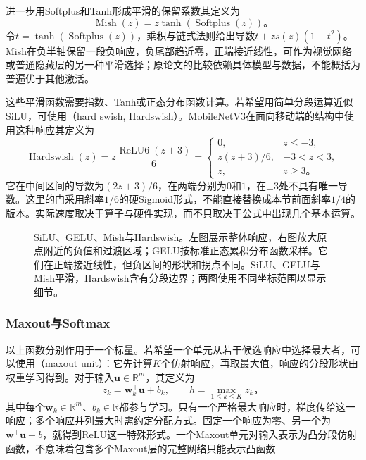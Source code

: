 进一步用Softplus和Tanh形成平滑的保留系数其定义为
\begin{equation}
  \operatorname{Mish}(z)=z\tanh(\operatorname{Softplus}(z))\text{。}
  \label{eq:ffn-mish}
\end{equation}
令$t=\tanh(\operatorname{Softplus}(z))$，乘积与链式法则给出导数$t+zs(z)(1-t^2)$。Mish在负半轴保留一段负响应，负尾部趋近零，正端接近线性，可作为视觉网络或普通隐藏层的另一种平滑选择；原论文的比较依赖具体模型与数据，不能概括为普遍优于其他激活。

这些平滑函数需要指数、Tanh或正态分布函数计算。若希望用简单分段运算近似SiLU，可使用（hard swish, Hardswish）。MobileNetV3在面向移动端的结构中使用这种响应其定义为
\begin{equation}
  \operatorname{Hardswish}(z)=z\frac{\operatorname{ReLU6}(z+3)}6
  =\begin{cases}
    0,&z\leq-3,\\
    z(z+3)/6,&-3<z<3,\\
    z,&z\geq3\text{。}
  \end{cases}
  \label{eq:ffn-hardswish}
\end{equation}
它在中间区间的导数为$(2z+3)/6$，在两端分别为$0$和$1$，在$\pm3$处不具有唯一导数。这里的门采用斜率$1/6$的硬Sigmoid形式，不能直接替换成本节前面斜率$1/4$的版本。实际速度取决于算子与硬件实现，而不只取决于公式中出现几个基本运算。

\begin{figure}[htb]
  \centering
  
  \caption{SiLU、GELU、Mish与Hardswish。左图展示整体响应，右图放大原点附近的负值和过渡区域；GELU按标准正态累积分布函数采样。它们在正端接近线性，但负区间的形状和拐点不同。SiLU、GELU与Mish平滑，Hardswish含有分段边界；两图使用不同坐标范围以显示细节。}
  \label{fig:ffn-activation-smooth}
\end{figure}

\subsubsection{Maxout与Softmax}
\label{sec:ffn-activation-vector}

以上函数分别作用于一个标量。若希望一个单元从若干候选响应中选择最大者，可以使用（maxout unit）：它先计算$K$个仿射响应，再取最大值，响应的分段形状由权重学习得到。对于输入$\bm{u}\in\mathbb{R}^{m}$，其定义为
\begin{equation}
  z_k=\bm{w}_k^{\top}\bm{u}+b_k,
  \qquad h=\max_{1\leq k\leq K}z_k\text{，}
  \label{eq:ffn-maxout}
\end{equation}
其中每个$\bm{w}_k\in\mathbb{R}^{m}$、$b_k\in\mathbb{R}$都参与学习。只有一个严格最大响应时，梯度传给这一响应；多个响应并列最大时需约定分配方式。固定一个响应为零、另一个为$\bm{w}^{\top}\bm{u}+b$，就得到ReLU这一特殊形式。一个Maxout单元对输入表示为凸分段仿射函数，不意味着包含多个Maxout层的完整网络只能表示凸函数

